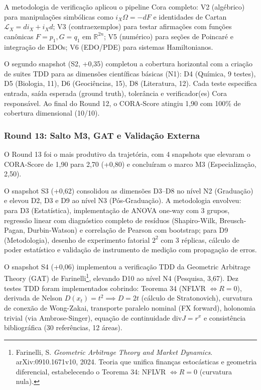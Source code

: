 A metodologia de verificação aplicou o pipeline Cora completo: V2
(algébrico) para manipulações simbólicas como $i_X\Omega = -dF$ e
identidades de Cartan $\mathcal{L}_X = di_X + i_Xd$; V3 (contraexemplos)
para testar afirmações com funções canônicas $F = p_1, G = q_1$ em
$\mathbb{R}^{2n}$; V5 (numérico) para seções de Poincaré e integração de
EDOs; V6 (EDO/PDE) para sistemas Hamiltonianos.

O segundo snapshot (S2, +0,35) completou a cobertura horizontal com a
criação de suites TDD para as dimensões científicas básicas (N1): D4
(Química, 9 testes), D5 (Biologia, 11), D6 (Geociências, 15), D8
(Literatura, 12). Cada teste especifica entrada, saída esperada (ground
truth), tolerância e verificador(es) Cora responsável. Ao final do
Round 12, o CORA-Score atingiu 1,90 com 100\% de cobertura dimensional
(10/10).

\subsubsection{Round 13: Salto M3, GAT e Validação Externa}

O Round 13 foi o mais produtivo da trajetória, com 4 snapshots que
elevaram o CORA-Score de 1,90 para 2,70 (+0,80) e concluíram o marco M3
(Especialização, 2,50).

O snapshot S3 (+0,62) consolidou as dimensões D3--D8 no nível N2
(Graduação) e elevou D2, D3 e D9 ao nível N3 (Pós-Graduação). A
metodologia envolveu: para D3 (Estatística), implementação de ANOVA
one-way com 3 grupos, regressão linear com diagnóstico completo de
resíduos (Shapiro-Wilk, Breusch-Pagan, Durbin-Watson) e correlação de
Pearson com bootstrap; para D9 (Metodologia), desenho de experimento
fatorial $2^2$ com 3 réplicas, cálculo de poder estatístico e validação
de instrumento de medição com propagação de erros.

O snapshot S4 (+0,06) implementou a verificação TDD da Geometric Arbitrage
Theory (GAT) de Farinelli\footnote{Farinelli, S. \textit{Geometric
Arbitrage Theory and Market Dynamics}. arXiv:0910.1671v10, 2024. Teoria
que unifica finanças estocásticas e geometria diferencial, estabelecendo
o Teorema 34: NFLVR $\iff R = 0$ (curvatura nula).}, elevando D10 ao
nível N4 (Pesquisa, 3,67). Dez testes TDD foram implementados cobrindo:
Teorema 34 (NFLVR $\iff R = 0$), derivada de Nelson $D(x_t) = t^2
\implies D = 2t$ (cálculo de Stratonovich), curvatura de conexão de
Wong-Zakai, transporte paralelo nominal (FX forward), holonomia trivial
(via Ambrose-Singer), equação de continuidade $\text{div} J = r^x$ e
consistência bibliográfica (30 referências, 12 áreas).

